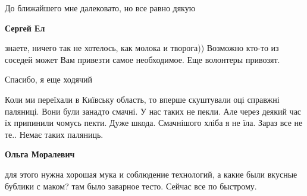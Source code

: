\begin{itemize}
\begin{itemize}
\begin{itemize}
До ближайшего мне далековато, но все равно дякую

\textbf{Сергей Ел} 

знаете, ничего так не хотелось, как молока и творога)) Возможно кто-то из
соседей может Вам привезти самое необходимое. Еще волонтеры привозят.


Спасибо, я еще ходячий

\end{itemize} %

\end{itemize} %


Коли ми переїхали в Київську область, то вперше скуштували оці справжні
паляниці. Вони були занадто смачні. У нас таких не пекли. Але через деякий час
їх припинили чомусь пекти. Дуже шкода. Смачнішого хліба я не їла. Зараз все не
те.. Немає таких паляниць.

\textbf{Ольга Моралевич} 

для этого нужна хорошая мука и соблюдение технологий, а какие были вкусные
бублики с маком? там было заварное тесто. Сейчас все по быстрому.


\end{itemize} %
